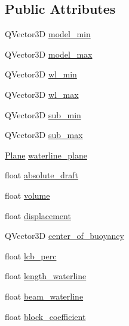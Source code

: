 \subsection*{Public Attributes}
\begin{DoxyCompactItemize}
\item 
Q\+Vector3D \hyperlink{structShipCAD_1_1HydrostaticsData_acd93669bc08fa097974d41fbaf4dc81f}{model\+\_\+min}
\item 
Q\+Vector3D \hyperlink{structShipCAD_1_1HydrostaticsData_a9319fb2ad054a595b6e3b3fd4059a3ae}{model\+\_\+max}
\item 
Q\+Vector3D \hyperlink{structShipCAD_1_1HydrostaticsData_a3bb2750b6306d9e8ae09bb4eebb1ed0c}{wl\+\_\+min}
\item 
Q\+Vector3D \hyperlink{structShipCAD_1_1HydrostaticsData_a332be807e8373521c238d82b9dcedc38}{wl\+\_\+max}
\item 
Q\+Vector3D \hyperlink{structShipCAD_1_1HydrostaticsData_a2d0a1e5f6bf98f8eceb958e5f7e7c73e}{sub\+\_\+min}
\item 
Q\+Vector3D \hyperlink{structShipCAD_1_1HydrostaticsData_ab3a6e316a991426c74673025439f123c}{sub\+\_\+max}
\item 
\hyperlink{classShipCAD_1_1Plane}{Plane} \hyperlink{structShipCAD_1_1HydrostaticsData_af93141f846f6622bb146cda042962303}{waterline\+\_\+plane}
\item 
float \hyperlink{structShipCAD_1_1HydrostaticsData_a6857139c04212164c5557cc816f80345}{absolute\+\_\+draft}
\item 
float \hyperlink{structShipCAD_1_1HydrostaticsData_acfbee81bded1b067a23cfc8cc9c00855}{volume}
\item 
float \hyperlink{structShipCAD_1_1HydrostaticsData_a92d1a8a97eb9b21bad485e40ac4461a0}{displacement}
\item 
Q\+Vector3D \hyperlink{structShipCAD_1_1HydrostaticsData_a316b31598f53f036c7008cc4910293f8}{center\+\_\+of\+\_\+buoyancy}
\item 
float \hyperlink{structShipCAD_1_1HydrostaticsData_a783b71d811732bbc002b52f21d63c83a}{lcb\+\_\+perc}
\item 
float \hyperlink{structShipCAD_1_1HydrostaticsData_ae65aa54bcbfb059f11aa174cfaa0447b}{length\+\_\+waterline}
\item 
float \hyperlink{structShipCAD_1_1HydrostaticsData_ab79755f5814572be0dfd3ae3ba214fca}{beam\+\_\+waterline}
\item 
float \hyperlink{structShipCAD_1_1HydrostaticsData_ac59c717b9869f0aacca4305fd81d4882}{block\+\_\+coefficient}
\item 

\end{DoxyCompactItemize}
